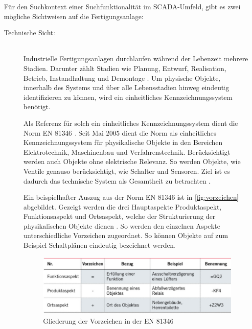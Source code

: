 Für den Suchkontext einer Suchfunktionalität im SCADA-Umfeld, gibt es zwei mögliche Sichtweisen auf die Fertigungsanlage:

\begin{description}
    \item[Technische Sicht:]\hfill \\
    Industrielle Fertigungsanlagen durchlaufen während der Lebenzeit mehrere Stadien. Darunter zählt Stadien wie Planung, Entwurf, Realisation, Betrieb, Instandhaltung und Demontage \cite{StefanSchwarzwalder.2019}. Um physische Objekte, innerhalb des Systems und über alle Lebensstadien hinweg eindeutig identifizieren zu können, wird ein einheitliches Kennzeichnungssystem benötigt.

    Als Referenz für solch ein einheitliches Kennzeichnungssystem dient die Norm \glqq EN 81346\grqq{} \cite{StefanSchwarzwalder.2019}. Seit Mai 2005 dient die Norm als einheitliches Kennzeichnungssystem für physikalische Objekte in den Bereichen Elektrotechnik, Maschinenbau und Verfahrenstechnik. Berücksichtigt werden auch Objekte ohne elektrische Relevanz. So werden Objekte, wie Ventile genauso berücksichtigt, wie Schalter und Sensoren. Ziel ist es dadurch das technische System als Gesamtheit zu betrachten \cite{StefanSchwarzwalder.2019}.

    Ein beispielhafter Auszug aus der Norm \glqq EN 81346\grqq{} ist in \autoref{fig:vorzeichen} abgebildet. Gezeigt werden die drei Hauptaspekte \glqq Produktaspekt\grqq{}, \glqq Funktionsaspekt\grqq{} und \glqq Ortsaspekt\grqq{}, welche der Strukturierung der physikalischen Objekte dienen \cite{StefanSchwarzwalder.2019}. So werden den einzelnen Aspekte unterschiedliche Vorzeichen zugeordnet. So können Objekte auf zum Beispiel Schaltplänen eindeutig bezeichnet werden.
    
    \begin{figure}[H]
        \centering
        \includegraphics[width=0.8\linewidth]{images/vorzeichen.png}
        \caption{Gliederung der Vorzeichen in der EN 81346 \cite{StefanSchwarzwalder.2019}}
        \label{fig:vorzeichen}
    \end{figure}


\end{description}
